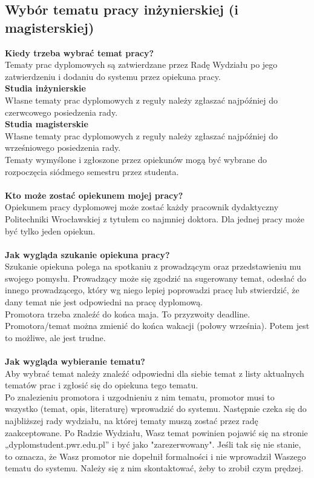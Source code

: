 \documentclass[11pt]{article}
\begin{document}
\subsection{Wybór tematu pracy inżynierskiej (i magisterskiej)}
\textbf{Kiedy trzeba wybrać temat pracy?} \\
\indent Tematy prac dyplomowych są zatwierdzane przez Radę Wydziału po jego zatwierdzeniu i dodaniu do systemu przez opiekuna pracy. \\
\indent \textbf{Studia inżynierskie} \\
\indent Własne tematy prac dyplomowych z reguły należy zgłaszać najpóźniej do czerwcowego posiedzenia rady. \\
\indent \textbf{Studia magisterskie} \\
\indent Własne tematy prac dyplomowych z reguły należy zgłaszać najpóźniej do wrześniowego posiedzenia rady. \\
\indent Tematy wymyślone i zgłoszone przez opiekunów mogą być wybrane do rozpoczęcia siódmego semestru przez studenta. \\\\
\textbf{Kto może zostać opiekunem mojej pracy?} \\
\indent Opiekunem pracy dyplomowej może zostać każdy pracownik dydaktyczny Politechniki Wrocławskiej z tytułem co najmniej doktora. Dla jednej pracy może być tylko jeden opiekun. \\\\
\textbf{Jak wygląda szukanie opiekuna pracy?} \\
\indent Szukanie opiekuna polega na spotkaniu z prowadzącym oraz przedstawieniu mu swojego pomysłu. Prowadzący może się zgodzić na sugerowany temat, odesłać do innego prowadzącego, który wg niego lepiej poprowadzi pracę lub stwierdzić, że dany temat nie jest odpowiedni na pracę dyplomową. \\
\indent Promotora trzeba znaleźć do końca maja. To przyzwoity deadline. \\
\indent Promotora/temat można zmienić do końca wakacji (połowy września). Potem jest to możliwe, ale jest trudne. \\\\
\textbf{Jak wygląda wybieranie tematu?} \\
\indent Aby wybrać temat należy znaleźć odpowiedni dla siebie temat z listy aktualnych tematów prac i zgłosić się do opiekuna tego tematu. \\
\indent Po znalezieniu promotora i uzgodnieniu z nim tematu, promotor musi to wszystko (temat, opis, literaturę) wprowadzić do systemu. Następnie czeka się do najbliższej rady wydziału, na której tematy muszą zostać przez radę zaakceptowane. Po Radzie Wydziału, Wasz temat powinien pojawić się na stronie „dyplomstudent.pwr.edu.pl” i być jako "zarezerwowany". Jeśli tak się nie stanie, to oznacza, że Wasz promotor nie dopełnił formalności i nie wprowadził Waszego tematu do systemu. Należy się z nim skontaktować, żeby to zrobił czym prędzej. \\\\
\end{document}
